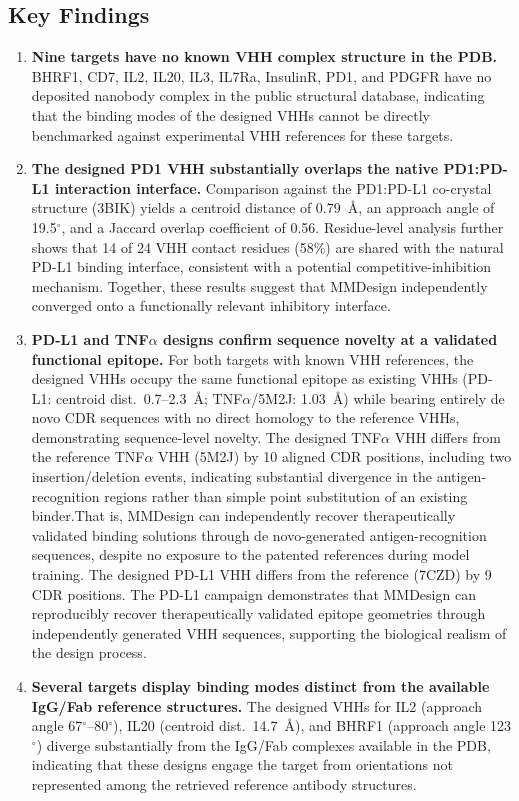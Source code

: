 \documentclass[11pt]{article}
\begin{document}
\subsection{Key Findings}
\begin{enumerate}
  \item \textbf{Nine targets have no known VHH complex structure in the PDB.} BHRF1, CD7, IL2, IL20, IL3, IL7Ra,
        InsulinR, PD1, and PDGFR have no deposited nanobody complex in the public structural database, indicating
        that the binding modes of the designed VHHs cannot be directly benchmarked against experimental
        VHH references for these targets.
  \item \textbf{The designed PD1 VHH substantially overlaps the native PD1:PD-L1 interaction interface.} Comparison
        against the PD1:PD-L1 co-crystal structure (3BIK) yields a centroid distance of 0.79~\AA{}, an approach
        angle of 19.5$^{\circ}$, and a Jaccard overlap coefficient of 0.56. Residue-level analysis further shows that 14 of
        24 VHH contact residues (58\%) are shared with the natural PD-L1 binding interface, consistent with a
        potential competitive-inhibition mechanism. Together, these results suggest that MMDesign independently
        converged onto a functionally relevant inhibitory interface.
  \item \textbf{PD-L1 and TNF$\alpha$ designs confirm sequence novelty at a validated functional epitope.}
        For both targets with known VHH references, the designed VHHs occupy the same functional epitope as
        existing VHHs (PD-L1: centroid dist.\ 0.7--2.3~\AA{}; TNF$\alpha$/5M2J: 1.03~\AA{}) while bearing entirely de novo CDR
        sequences with no direct homology to the reference VHHs, demonstrating sequence-level novelty.
        The designed TNF$\alpha$ VHH differs from the reference TNF$\alpha$ VHH (5M2J) by 10 aligned CDR positions,
        including two insertion/deletion events, indicating substantial divergence in the antigen-recognition
        regions rather than simple point substitution of an existing binder.That is, MMDesign can independently
        recover therapeutically validated binding solutions through de novo-generated antigen-recognition
        sequences, despite no exposure to the patented references during model training.
        The designed PD-L1 VHH differs from the reference (7CZD) by 9 CDR positions. The PD-L1 campaign
        demonstrates that MMDesign can reproducibly recover therapeutically validated epitope geometries
        through independently generated VHH sequences, supporting the biological realism of the design process.
  \item \textbf{Several targets display binding modes distinct from the available IgG/Fab reference structures.} The
        designed VHHs for IL2 (approach angle 67$^{\circ}$--80$^{\circ}$), IL20 (centroid dist.\ 14.7~\AA{}), and BHRF1 (approach angle
        123$^{\circ}$) diverge substantially from the IgG/Fab complexes available in the PDB, indicating that these designs
        engage the target from orientations not represented among the retrieved reference antibody structures.
\end{enumerate}
\end{document}
